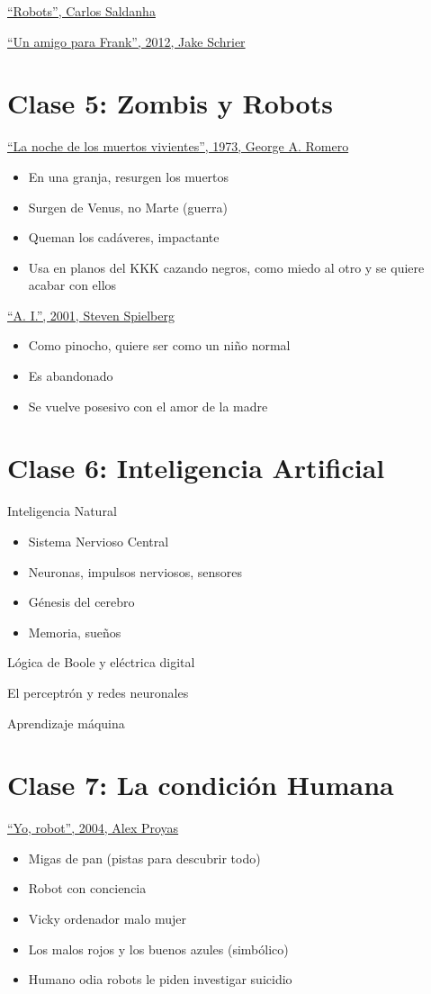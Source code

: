 \documentclass[12pt, twoside, openright]{report} %
\begin{document}
\underline{\enquote{Robots}, Carlos Saldanha}

\underline{\enquote{Un amigo para Frank}, 2012, Jake Schrier}

\chapter{Clase 5: Zombis y Robots}
\underline{\enquote{La noche de los muertos vivientes}, 1973, George A. Romero}
\begin{itemize}
	\item En una granja, resurgen los muertos
	\item Surgen de Venus, no Marte (guerra)
	\item Queman los cadáveres, impactante
	\item Usa en planos del KKK cazando negros, como miedo al otro y se quiere acabar con ellos
\end{itemize}

\underline{\enquote{A. I.}, 2001, Steven Spielberg}
\begin{itemize}
	\item Como pinocho, quiere ser como un niño normal
	\item Es abandonado
	\item Se vuelve posesivo con el amor de la madre
\end{itemize}

\chapter{Clase 6: Inteligencia Artificial}
Inteligencia Natural
\begin{itemize}
	\item Sistema Nervioso Central
	\item Neuronas, impulsos nerviosos, sensores
	\item Génesis del cerebro
	\item Memoria, sueños
\end{itemize}

Lógica de Boole y eléctrica digital

El perceptrón y redes neuronales

Aprendizaje máquina

\chapter{Clase 7: La condición Humana}
\underline{\enquote{Yo, robot}, 2004, Alex Proyas}
\begin{itemize}
	\item Migas de pan (pistas para descubrir todo)
	\item Robot con conciencia
	\item Vicky ordenador malo mujer
	\item Los malos rojos y los buenos azules (simbólico)
	\item Humano odia robots le piden  investigar suicidio
\end{itemize}
\end{document}
